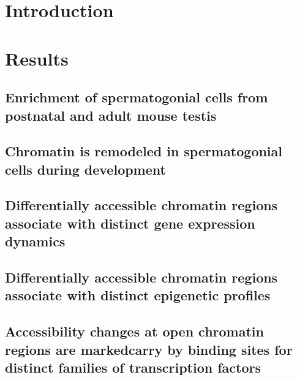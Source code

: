 \documentclass[12pt,twoside]{reedthesis}
\begin{document}
\hypertarget{introduction}{%
\section{Introduction}\label{introduction}}

\newpage

\hypertarget{results}{%
\section{Results}\label{results}}

\hypertarget{enrichment-of-spermatogonial-cells-from-postnatal-and-adult-mouse-testis}{%
\subsection{Enrichment of spermatogonial cells from postnatal and adult mouse testis}\label{enrichment-of-spermatogonial-cells-from-postnatal-and-adult-mouse-testis}}

\hypertarget{chromatin-is-remodeled-in-spermatogonial-cells-during-development}{%
\subsection{Chromatin is remodeled in spermatogonial cells during development}\label{chromatin-is-remodeled-in-spermatogonial-cells-during-development}}

\hypertarget{differentially-accessible-chromatin-regions-associate-with-distinct-gene-expression-dynamics}{%
\subsection{Differentially accessible chromatin regions associate with distinct gene expression dynamics}\label{differentially-accessible-chromatin-regions-associate-with-distinct-gene-expression-dynamics}}

\hypertarget{differentially-accessible-chromatin-regions-associate-with-distinct-epigenetic-profiles}{%
\subsection{Differentially accessible chromatin regions associate with distinct epigenetic profiles}\label{differentially-accessible-chromatin-regions-associate-with-distinct-epigenetic-profiles}}

\hypertarget{accessibility-changes-at-open-chromatin-regions-are-markedcarry-by-binding-sites-for-distinct-families-of-transcription-factors}{%
\subsection{Accessibility changes at open chromatin regions are markedcarry by binding sites for distinct families of transcription factors}\label{accessibility-changes-at-open-chromatin-regions-are-markedcarry-by-binding-sites-for-distinct-families-of-transcription-factors}}
\end{document}
